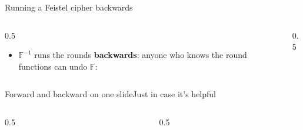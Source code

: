 \ifdefined\PRESENTATION\else\PassOptionsToClass{handout}{beamer}\fi\documentclass[aspectratio=169, lualatex]{beamer}
\begin{document}
\begin{frame}{Running a Feistel cipher backwards}
	\begin{columns}[c]
		\begin{column}{0.5\textwidth}
			\begin{itemize}
				\item $\mathbb{F}^{-1}$ runs the rounds \textbf{backwards}: anyone who knows the round functions can undo $\mathbb{F}$:
				      \begin{center}
				      \end{center}
			\end{itemize}
		\end{column}
		\begin{column}{0.5\textwidth}
		\end{column}
	\end{columns}
\end{frame}

\begin{frame}{Forward and backward on one slide}{Just in case it's helpful}
	\begin{columns}[c]
		\begin{column}{0.5\textwidth}
		\end{column}
		\begin{column}{0.5\textwidth}
		\end{column}
	\end{columns}
\end{frame}
\end{document}
